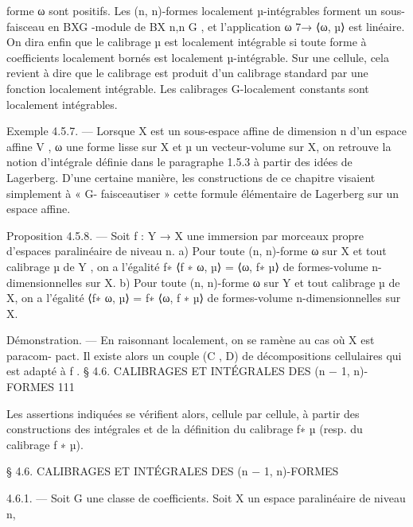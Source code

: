 \documentclass[
  10pt,
]{article}
\newenvironment{Shaded}{}{}
\newcommand{\NormalTok}[1]{#1}
\begin{document}
\begin{Shaded}
\begin{Highlighting}[]
\NormalTok{forme ω sont positifs.}
\NormalTok{   Les (n, n){-}formes localement µ{-}intégrables forment un sous{-}faisceau en BXG {-}module}
\NormalTok{de BX n,n}
\NormalTok{        G}
\NormalTok{          , et l’application ω 7→ ⟨ω, µ⟩ est linéaire.}
\NormalTok{   On dira enfin que le calibrage µ est localement intégrable si toute forme à coefficients}
\NormalTok{localement bornés est localement µ{-}intégrable. Sur une cellule, cela revient à dire que}
\NormalTok{le calibrage est produit d’un calibrage standard par une fonction localement intégrable.}
\NormalTok{Les calibrages G{-}localement constants sont localement intégrables.}

\NormalTok{Exemple 4.5.7. — Lorsque X est un sous{-}espace affine de dimension n d’un espace}
\NormalTok{affine V , ω une forme lisse sur X et µ un vecteur{-}volume sur X, on retrouve la notion}
\NormalTok{d’intégrale définie dans le paragraphe 1.5.3 à partir des idées de Lagerberg.}
\NormalTok{   D’une certaine manière, les constructions de ce chapitre visaient simplement à « G{-}}
\NormalTok{faisceautiser » cette formule élémentaire de Lagerberg sur un espace affine.}

\NormalTok{Proposition 4.5.8. — Soit f : Y → X une immersion par morceaux propre d’espaces}
\NormalTok{paralinéaire de niveau n.}
\NormalTok{   a) Pour toute (n, n){-}forme ω sur X et tout calibrage µ de Y , on a l’égalité f∗ ⟨f ∗ ω, µ⟩ =}
\NormalTok{⟨ω, f∗ µ⟩ de formes{-}volume n{-}dimensionnelles sur X.}
\NormalTok{   b) Pour toute (n, n){-}forme ω sur Y et tout calibrage µ de X, on a l’égalité ⟨f∗ ω, µ⟩ =}
\NormalTok{f∗ ⟨ω, f ∗ µ⟩ de formes{-}volume n{-}dimensionnelles sur X.}

\NormalTok{Démonstration. — En raisonnant localement, on se ramène au cas où X est paracom{-}}
\NormalTok{pact. Il existe alors un couple (C , D) de décompositions cellulaires qui est adapté à f .}
\NormalTok{                  § 4.6. CALIBRAGES ET INTÉGRALES DES (n − 1, n){-}FORMES                  111}

\NormalTok{Les assertions indiquées se vérifient alors, cellule par cellule, à partir des constructions}
\NormalTok{des intégrales et de la définition du calibrage f∗ µ (resp. du calibrage f ∗ µ).}



\NormalTok{     § 4.6. CALIBRAGES ET INTÉGRALES DES (n − 1, n){-}FORMES}

\NormalTok{4.6.1. — Soit G une classe de coefficients. Soit X un espace paralinéaire de niveau n,}
\end{Highlighting}
\end{Shaded}
\end{document}
